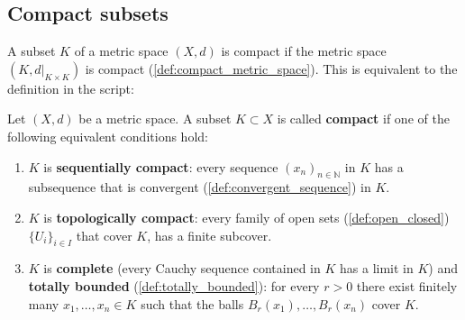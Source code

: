 
\subsection{Compact subsets}

A subset $K$ of a metric space $(X,d)$ is compact if the metric space $(K, d|_{K \times K})$ is
compact (\cref{def:compact_metric_space}). This is equivalent to the definition in the script:

\begin{definition}
\label{def:sequential_topological_compactness}
Let $(X,d)$ be a metric space. A subset $K \subset X$ is called \textbf{compact} if one of the
following equivalent conditions hold:
\begin{enumerate}[label=\textbf{(\alph*)}]
  \item \label{item:seq_compact_def963}
    $K$ is \textbf{sequentially compact}: every sequence $(x_n)_{n\in\mathbb{N}}$ in $K$ has
    a subsequence that is convergent (\cref{def:convergent_sequence}) in $K$.
  \item \label{item:top_compact_def963}
    $K$ is \textbf{topologically compact}: every family of open sets
    (\cref{def:open_closed}) $\{U_i\}_{i \in I}$ that cover $K$, has a finite subcover.
  \item \label{item:complete_totally_bounded_def963}
    $K$ is \textbf{complete} (every Cauchy sequence contained in $K$ has a limit in $K$) and
    \textbf{totally bounded} (\cref{def:totally_bounded}): for every $r>0$ there exist finitely
    many $x_1,\dots,x_n \in K$ such that the balls $B_r(x_1),\dots,B_r(x_n)$ cover $K$.
\end{enumerate}
\end{definition}


